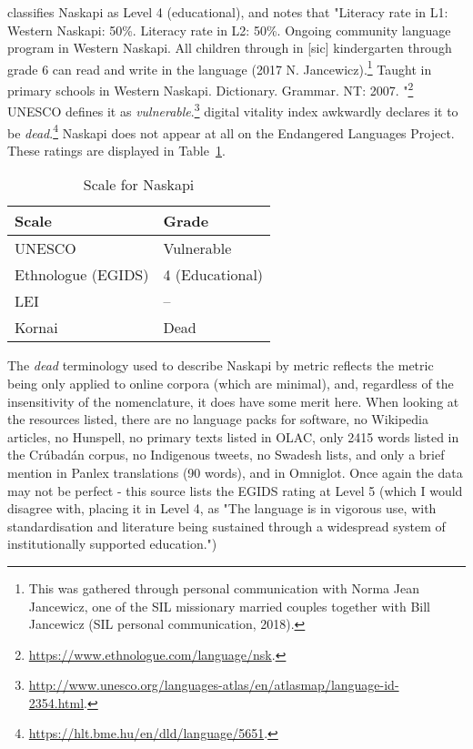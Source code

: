 \citet{lewis2009ethnologue} classifies Naskapi as Level 4 (educational), and notes that "Literacy rate in L1: Western Naskapi: 50\%. Literacy rate in L2: 50\%. Ongoing community language program in Western Naskapi. All children through in [sic] kindergarten through grade 6 can read and write in the language (2017 N. Jancewicz).\footnote{This was gathered through personal communication with Norma Jean Jancewicz, one of the SIL missionary married couples together with Bill Jancewicz (SIL personal communication, 2018).} Taught in primary schools in Western Naskapi. Dictionary. Grammar. NT: 2007. "\footnote{\href{https://www.ethnologue.com/language/nsk}{https://www.ethnologue.com/language/nsk}. } UNESCO defines it as {\it vulnerable}.\footnote{\href{http://www.unesco.org/languages-atlas/en/atlasmap/language-id-2354.html}{http://www.unesco.org/languages-atlas/en/atlasmap/language-id-2354.html}. }  digital vitality index awkwardly declares it to be {\it dead}.\footnote{\href{https://hlt.bme.hu/en/dld/language/5651}{https://hlt.bme.hu/en/dld/language/5651}. } Naskapi does not appear at all on the Endangered Languages Project. These ratings are displayed in Table~\ref{table:naskapi}.

\begin{table}
\centering
\begin{tabular}{|p{5cm}|p{5cm}|} \hline
{\bf Scale} & {\bf Grade} \\ \hline
UNESCO & Vulnerable \\ \hline
Ethnologue (EGIDS) & 4 (Educational) \\ \hline
LEI & -- \\ \hline
Kornai & Dead \\ \hline
\end{tabular}
\caption{Scale for Naskapi}
\label{table:naskapi}
\end{table}

The {\it dead} terminology used to describe Naskapi by  metric reflects the metric being only applied to online corpora (which are minimal), and, regardless of the insensitivity of the nomenclature, it does have some merit here. When looking at the resources listed, there are no language packs for software, no Wikipedia articles, no Hunspell, no primary texts listed in OLAC, only 2415 words listed in the Cr\'ubad\'an corpus, no Indigenous tweets, no Swadesh lists, and only a brief mention in Panlex translations (90 words), and in Omniglot. Once again the data may not be perfect - this source lists the EGIDS rating at Level 5 (which I would disagree with, placing it in Level 4, as "The language is in vigorous use, with standardisation and literature being sustained through a widespread system of institutionally supported education.")

